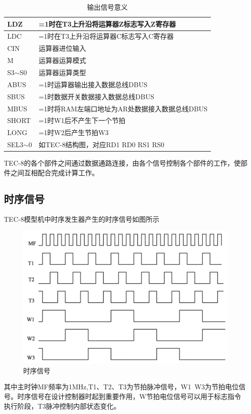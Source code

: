 \begin{table}[htbp]
{\begin{tabular}{|l|l|}
    LDZ         & =1时在T3上升沿将运算器Z标志写入Z寄存器                                 \\ \hline
    LDC         & =1时在T3上升沿将运算器C标志写入C寄存器                                 \\ \hline
    CIN         & 运算器进位输入                                                \\ \hline
    M           & 运算器运算模式                                                \\ \hline
    S3$\sim$S0  & 运算器运算类型                                                \\ \hline
    ABUS        & =1时运算器输出接入数据总线DBUS                                     \\ \hline
    SBUS        & =1时数据开关数据接入数据总线DBUS                                    \\ \hline
    MBUS        & =1时将RAM左端口地址为AR处数据接入数据总线DBUS                           \\ \hline
    SHORT       & =1时W1后不产生下一个节拍                                         \\ \hline
    LONG        & =1时W2后产生节拍W3                                           \\ \hline
    SEL3$\sim$0 & 如TEC-8结构图，对应RD1 RD0 RS1 RS0                            \\ \hline
    \end{tabular}}
    \caption{输出信号意义}
    
\end{table}

TEC-8的各个部件之间通过数据通路连接，由各个信号控制各个部件的工作，使部件之间互相配合完成计算工作。

\subsection{时序信号}

TEC-8模型机中时序发生器产生的时序信号如图所示

\begin{figure}[htbp]
    \centering
    \includegraphics[width=0.9\linewidth]{figures/chapter1/timing.png}
    \caption{时序信号}
\end{figure}

其中主时钟MF频率为1MHz,T1、T2、T3为节拍脉冲信号，W1~W3为节拍电位信号。时序信号在设计控制器时起到重要作用，W节拍电位信号可以用于标志指令执行阶段，T3脉冲控制内部状态变化。

